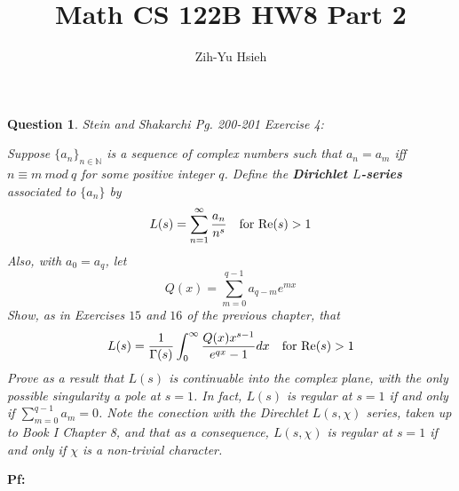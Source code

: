 \documentclass{article}
\title{Math CS 122B HW8 Part 2}
\author{Zih-Yu Hsieh}
\newtheorem{question}{Question}
\begin{document}
\maketitle

\section{}
\begin{question}\label{q:1}
    Stein and Shakarchi Pg. 200-201 Exercise 4:

    Suppose $\{a_n\}_{n\in\mathbb{N}}$ is a sequence of complex numbers such that $a_n=a_m$ iff $n\equiv m\ mod\ q$ for some positive integer $q$. Define the \textbf{Dirichlet $L$-series} associated to $\{a_n\}$ by 
    $$L(s)=\sum_{n=1}^{\infty}\frac{a_n}{n^s}\quad \textmd{for Re}(s)>1$$
    Also, with $a_0=a_q$, let 
    $$Q(x)=\sum_{m=0}^{q-1}a_{q-m}e^{mx}$$
    Show, as in Exercises $15$ and $16$ of the previous chapter, that 
    $$L(s)=\frac{1}{\Gamma(s)}\int_{0}^{\infty}\frac{Q(x)x^{s-1}}{e^{qx}-1}dx\quad \textmd{for Re}(s)>1$$
    Prove as a result that $L(s)$ is continuable into the complex plane, with the only possible singularity a pole at $s=1$. In fact, $L(s)$ is regular at $s=1$ if and only if $\sum_{m=0}^{q-1}a_m=0$. Note the conection with the Direchlet $L(s,\chi)$ series, taken up to Book I Chapter 8, and that as a consequence, $L(s,\chi)$ is regular at $s=1$ if and only if $\chi$ is a non-trivial character.
\end{question}

\textbf{Pf:}
\end{document}
